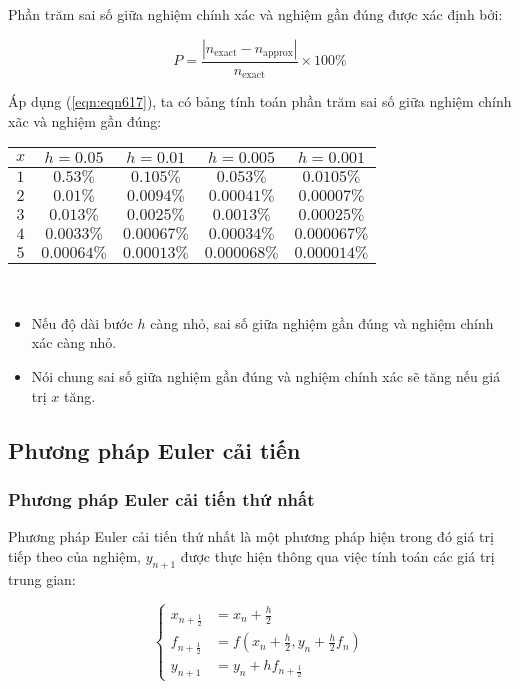 Phần trăm sai số giữa nghiệm chính xác và nghiệm gần đúng được xác định bởi:\par
\begin{equation}\label{eqn:eqn617}
	P=\frac{|n_\text{exact}-n_\text{approx}|}{n_\text{exact}}\times 100\%
\end{equation}

Áp dụng (\ref{eqn:eqn617}), ta có bảng tính toán phần trăm sai số giữa nghiệm chính xãc và nghiệm gần đúng:
\begin{center}\begin{tabular}{|c|c|c|c|c|}\hline
	$x$ & $h=0.05$    & $h=0.01$    & $h=0.005$    & $h=0.001$    \\\hline
	$1$ & $0.53\%$    & $0.105\%$   & $0.053\%$    & $0.0105\%$   \\\hline
	$2$ & $0.01\%$    & $0.0094\%$  & $0.00041\%$  & $0.00007\%$  \\\hline
	$3$ & $0.013\%$   & $0.0025\%$  & $0.0013\%$   & $0.00025\%$  \\\hline
	$4$ & $0.0033\%$  & $0.00067\%$ & $0.00034\%$  & $0.000067\%$ \\\hline
	$5$ & $0.00064\%$ & $0.00013\%$ & $0.000068\%$ & $0.000014\%$ \\\hline
\end{tabular}\end{center}

\begin{remark}~\begin{itemize}
	\item Nếu độ dài bước $h$ càng nhỏ, sai số giữa nghiệm gần đúng và nghiệm chính xác càng nhỏ.
	\item Nói chung sai số giữa nghiệm gần đúng và nghiệm chính xác sẽ tăng nếu giá trị $x$ tăng.
\end{itemize}\end{remark}

\subsection{Phương pháp Euler cải tiến}
\subsubsection{Phương pháp Euler cải tiến thứ nhất}

Phương pháp Euler cải tiến thứ nhất là một phương pháp hiện trong đó giá trị tiếp theo của nghiệm, $y_{n+1}$ được thực hiện thông qua việc tính toán các giá trị trung gian:\par
\begin{equation}\label{eqn:eqn618}\begin{cases}
	x_{n+\frac12}&=x_n+\frac h2\\
	f_{n+\frac12}&=f\left(x_n+\frac h2, y_n+\frac h2f_n\right)\\
	y_{n+1}&=y_n+hf_{n+\frac12}
\end{cases}\end{equation}

